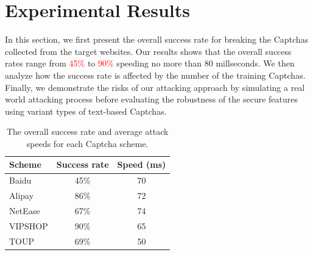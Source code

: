 \section{Experimental Results}
In this section, we first present the overall success rate for breaking the Captchas collected from the target websites. Our results shows that the overall success rates range from \textcolor{red}{45\%} to \textcolor{red}{90\%} speeding no more than 80 millseconds.
We then analyze how the success rate is affected by the number of the training Captchas.
Finally, we demonstrate the risks of our attacking approach by simulating a real world attacking process before evaluating the robustness of the secure features using variant types of text-based Captchas.

\begin{table}[t]
    \centering
    \caption{The overall success rate and average attack speeds for each Captcha scheme.}
    \label{table: overall_rate}
    \begin{tabular}{lcc}
        \toprule
        Scheme & Success rate  & Speed (ms)\\
        \midrule
        Baidu & 45\% & 70 \\
        Alipay & 86\% & 72 \\
        NetEase & 67\% & 74 \\
        VIPSHOP & 90\% & 65 \\
        TOUP & 69\% & 50 \\
        \bottomrule
    \end{tabular}
\end{table}


